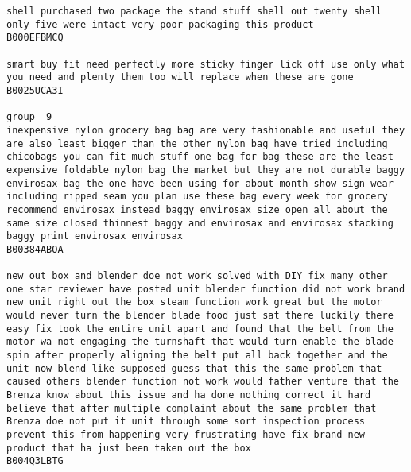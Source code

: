 \documentclass[11pt]{article}
\begin{document}
\begin{Verbatim}[commandchars=\\\{\}]
shell purchased two package the stand stuff shell out twenty shell only five were intact very poor packaging this product
B000EFBMCQ

smart buy fit need perfectly more sticky finger lick off use only what you need and plenty them too will replace when these are gone
B0025UCA3I

group  9
inexpensive nylon grocery bag bag are very fashionable and useful they are also least bigger than the other nylon bag have tried including chicobags you can fit much stuff one bag for bag these are the least expensive foldable nylon bag the market but they are not durable baggy envirosax bag the one have been using for about month show sign wear including ripped seam you plan use these bag every week for grocery recommend envirosax instead baggy envirosax size open all about the same size closed thinnest baggy and envirosax and envirosax stacking baggy print envirosax envirosax
B00384ABOA

new out box and blender doe not work solved with DIY fix many other one star reviewer have posted unit blender function did not work brand new unit right out the box steam function work great but the motor would never turn the blender blade food just sat there luckily there easy fix took the entire unit apart and found that the belt from the motor wa not engaging the turnshaft that would turn enable the blade spin after properly aligning the belt put all back together and the unit now blend like supposed guess that this the same problem that caused others blender function not work would father venture that the Brenza know about this issue and ha done nothing correct it hard believe that after multiple complaint about the same problem that Brenza doe not put it unit through some sort inspection process prevent this from happening very frustrating have fix brand new product that ha just been taken out the box
B004Q3LBTG


\end{Verbatim}
\end{document}

